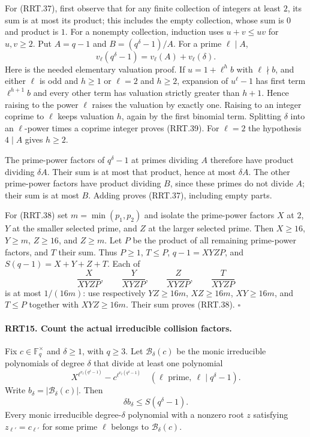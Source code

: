 For (RRT.37), first observe that for any finite collection of
integers at least $2$, its sum is at most its product; this
includes the empty collection, whose sum is $0$ and product
is $1$.  For a nonempty collection, induction uses
$u+v\le uv$ for $u,v\ge2$.  Put $A=q-1$ and
$B=(q^\delta-1)/A$.  For a prime $\ell\mid A$,
\[
 v_\ell(q^\delta-1)=v_\ell(A)+v_\ell(\delta).
 \tag{RRT.39}
\]
Here is the needed elementary valuation proof.  If
$u=1+\ell^h b$ with $\ell\nmid b$, and either $\ell$ is odd
and $h\ge1$ or $\ell=2$ and $h\ge2$, expansion of
$u^\ell-1$ has first term $\ell^{h+1}b$ and every other
term has valuation strictly greater than $h+1$.  Hence
raising to the power $\ell$ raises the valuation by exactly
one.  Raising to an integer coprime to $\ell$ keeps valuation
$h$, again by the first binomial term.  Splitting $\delta$
into an $\ell$-power times a coprime integer proves (RRT.39).
For $\ell=2$ the hypothesis $4\mid A$ gives $h\ge2$.

The prime-power factors of $q^\delta-1$ at primes dividing
$A$ therefore have product dividing $\delta A$.  Their sum
is at most that product, hence at most $\delta A$.  The other
prime-power factors have product dividing $B$, since these
primes do not divide $A$; their sum is at most $B$.
Adding proves (RRT.37), including empty parts.

For (RRT.38) set $m=\min(p_1,p_2)$ and isolate the
prime-power factors $X$ at $2$, $Y$ at the smaller selected
prime, and $Z$ at the larger selected prime.  Then
$X\ge16$, $Y\ge m$, $Z\ge16$, and $Z\ge m$.
Let $P$ be the product of all remaining prime-power factors,
and $T$ their sum.  Thus $P\ge1$, $T\le P$,
$q-1=XYZP$, and $S(q-1)=X+Y+Z+T$.
Each of
\[
 \frac{X}{XYZP},\qquad \frac{Y}{XYZP},\qquad
 \frac{Z}{XYZP},\qquad \frac{T}{XYZP}
\]
is at most $1/(16m)$: use respectively $YZ\ge16m$,
$XZ\ge16m$, $XY\ge16m$, and $T\le P$ together with
$XYZ\ge16m$.  Their sum proves (RRT.38).
\hfill$\square$

\paragraph{RRT15. Count the actual irreducible collision factors.}
\label{claim:RRT15}
Fix $c\in\mathbb F_q^\times$ and $\delta\ge1$, with $q\ge3$.
Let $\mathcal B_\delta(c)$ be the monic irreducible polynomials
of degree $\delta$ that divide at least one polynomial
\[
 X^{\ell^{v_\ell(q^\delta-1)}}
             -c^{\ell^{v_\ell(q^\delta-1)}}
       \quad(\ell\text{ prime},\ \ell\mid q^\delta-1).
 \tag{RRT.40}
\]
Write $b_\delta=|\mathcal B_\delta(c)|$.  Then
\[
                  \delta b_\delta\le S(q^\delta-1).
 \tag{RRT.41}
\]
Every monic irreducible degree-$\delta$ polynomial with a
nonzero root $z$ satisfying $z_{\ell'}=c_{\ell'}$ for some
prime $\ell$ belongs to $\mathcal B_\delta(c)$.

